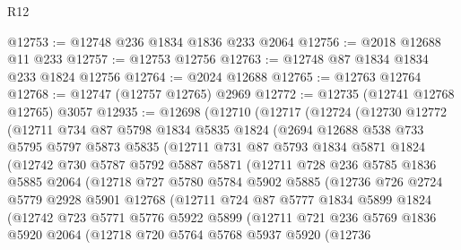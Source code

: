 \begin{lexlean}{R12}
\begin{coremodule}
@12753 := @12748 @236 @1834 @1836 @233 @2064
@12756 := @2018 @12688 @11 @233
@12757 := @12753 @12756
@12763 := @12748 @87 @1834 @1834 @233 @1824 @12756
@12764 := @2024 @12688
@12765 := @12763 @12764
@12768 := @12747 (@12757 @12765) @2969
@12772 := @12735 (@12741 @12768 @12765) @3057
@12935 := @12698
    (@12710
      (@12717
        (@12724
          (@12730
            @12772
            (@12711
              @734
              @87
              @5798
              @1834
              @5835
              @1824
              (@2694
                @12688
                @538
                @733
                @5795
                @5797
                @5873
                @5835
                (@12711
                  @731
                  @87
                  @5793
                  @1834
                  @5871
                  @1824
                  (@12742
                    @730
                    @5787
                    @5792
                    @5887
                    @5871
                    (@12711
                      @728
                      @236
                      @5785
                      @1836
                      @5885
                      @2064
                      (@12718
                        @727
                        @5780
                        @5784
                        @5902
                        @5885
                        (@12736
                          @726
                          @2724
                          @5779
                          @2928
                          @5901
                          @12768
                          (@12711
                            @724
                            @87
                            @5777
                            @1834
                            @5899
                            @1824
                            (@12742
                              @723
                              @5771
                              @5776
                              @5922
                              @5899
                              (@12711
                                @721
                                @236
                                @5769
                                @1836
                                @5920
                                @2064
                                (@12718
                                  @720
                                  @5764
                                  @5768
                                  @5937
                                  @5920
                                  (@12736

\end{coremodule}
\end{lexlean}

